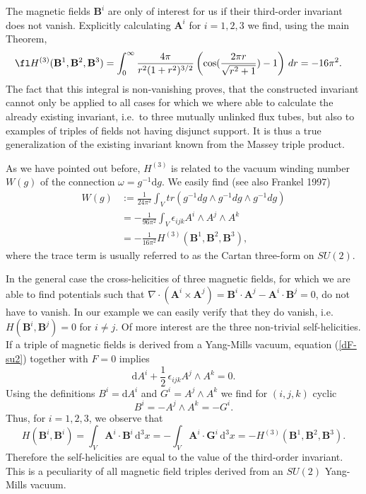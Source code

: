 \documentclass[10pt]{iopart}
\def \d{\mbox{d}}
\def \dxxx{\,\d^{3}\!x}
\def \Eq{equation }
\def \bA{{\mathbf{A}}}
\def \bB{{\mathbf{B}}}
\def \bG{{\mathbf{G}}}
\def \indi{i}
\def \indj{j}
\def \indk{k}
\begin{document}
The magnetic fields $\bB^i$ are only of interest for us if their 
third-order invariant 
does not vanish.
Explicitly calculating $\bA^i$ for $i=1,2,3$ we find,
using the main Theorem,
\begin{eqnarray}
\fl
H^{(3)}(\bB^1,\bB^2,\bB^3) 
   &= \int_0^\infty \frac{4\pi}{r^2(1+r^2)^{3/2}}
      \left(\cos(\frac{2\pi r}{\sqrt{r^2+1}})-1\right)\,dr
   = -16 \pi^2 \label{H-3-in-example}.
\end{eqnarray}
The fact that this integral is non-vanishing proves, that the
constructed invariant cannot only be applied to all cases for which
we where able to calculate the already existing invariant, i.e.~to
three mutually unlinked flux tubes, but also to examples of triples of 
fields not having
disjunct support.
It is thus a true
generalization of the existing invariant known from the Massey
triple product.

As we have pointed out before, $H^{(3)}$ is
related to the vacuum winding number $W(g)$ of the connection 
$\omega=g^{-1}\d g$. We easily find (see also Frankel 1997) 
\begin{eqnarray}
 W(g)  &:= \nonumber
 \frac{1}{24\pi^2}\int_V tr(g^{-1} d g \wedge g^{-1} d g \wedge g^{-1} d g)\\
         &= 
   - \frac{1}{96\pi^2}\int_V\epsilon_{\indi\indj\indk}
                  A^\indi \wedge A^\indj \wedge A^\indk
  \label{H-3-and-W} \\
         &= -\frac{1}{16\pi^2} H^{(3)}(\bB^1,\bB^2,\bB^3), \nonumber 
\end{eqnarray}
where the trace term is usually 
referred to as the Cartan three-form on $SU(2)$.

In the general case the cross-helicities of three magnetic
fields, for which we are able to find potentials such that 
$\nabla\cdot(\bA^i\times\bA^j)=\bB^i\cdot\bA^j-\bA^i\cdot\bB^j= 0$,
do not have to vanish.
In our example we can easily verify that they do vanish, i.e.
$H(\bB^i,\bB^j) = 0$ for $i\ne j$.
Of more interest are the three non-trivial self-helicities.
If a triple of magnetic fields is derived from 
a Yang-Mills vacuum, \Eq  (\ref{dF-su2}) together with $F=0$ implies
\[
  \d A^\indi+\frac{1}{2}\,\epsilon_{\indi\indj\indk}A^\indj\wedge A^\indk = 0.
\]
Using the definitions 
$ B^\indi = \d A^\indi$
and 
$G^\indi = A^\indj \wedge A^\indk$
we find for $(\indi,\indj,\indk)$ cyclic
\[
   B^\indi = -A^ \indj \wedge A^\indk = - G^\indi.
\]
Thus, for $i=1,2,3$, we observe that
\[
   H(\bB^i,\bB^i) =  \int_V \bA^i\cdot\bB^i \dxxx 
                  = -\int_V \bA^i\cdot\bG^i \dxxx = -H^{(3)}(\bB^1,\bB^2,\bB^3).
\]
Therefore the self-helicities are equal to the value of the third-order
invariant. This is a peculiarity of all magnetic field triples 
derived from an $SU(2)$ Yang-Mills vacuum.
\end{document}
